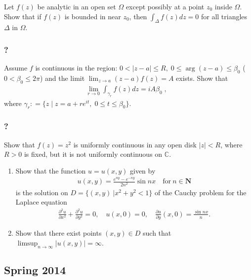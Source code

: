 Let \(f(z)\) be analytic in an open set \(\Omega\) except possibly at a
point \(z_0\) inside \(\Omega\). Show that if \(f(z)\) is bounded in
near \(z_0\), then \(\displaystyle \int_\Delta f(z) dz = 0\) for all
triangles \(\Delta\) in \(\Omega\).

\hypertarget{section-120}{%
\subsubsection{?}\label{section-120}}

Assume \(f\) is continuous in the region:
\(0< |z-a| \leq R, \; 0 \leq \arg(z-a) \leq \beta_0\)
(\(0 < \beta_0 \leq 2 \pi\)) and the limit
\(\displaystyle \lim_{z \rightarrow a} (z-a) f(z) = A\) exists. Show
that
\begin{align*}\lim_{r \rightarrow 0} \int_{\gamma_r} f(z) dz  = i A \beta_0 \; , \; \;\end{align*}
where
\(\gamma_r : = \{ z \; | \; z = a + r e^{it}, \; 0 \leq t \leq \beta_0 \}.\)

\hypertarget{section-121}{%
\subsubsection{?}\label{section-121}}

Show that \(f(z) = z^2\) is uniformly continuous in any open disk
\(|z| < R\), where \(R>0\) is fixed, but it is not uniformly continuous
on \(\mathbb C\).

\begin{enumerate}
\def\labelenumi{(\arabic{enumi})}
\tightlist
\item
  Show that the function \(u=u(x,y)\) given by
  \begin{align*}u(x,y)=\frac{e^{ny}-e^{-ny}}{2n^2}\sin nx\quad \text{for}\ n\in {\mathbf N}\end{align*}
  is the solution on \(D=\{(x,y)\ | x^2+y^2<1\}\) of the Cauchy problem
  for the Laplace equation
  \begin{align*}\frac{\partial ^2u}{\partial x^2}+\frac{\partial ^2u}{\partial y^2}=0,\quad
  u(x,0)=0,\quad \frac{\partial u}{\partial y}(x,0)=\frac{\sin nx}{n}.\end{align*}
\item
  Show that there exist points \((x,y)\in D\) such that
  \(\displaystyle{\limsup_{n\to\infty} |u(x,y)|=\infty}\).
\end{enumerate}

\hypertarget{spring-2014}{%
\subsection{Spring 2014}\label{spring-2014}}

